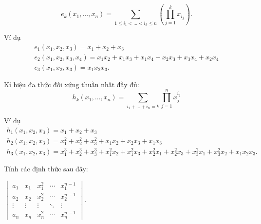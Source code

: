 \documentclass[class=linearalgebra,crop=false]{standalone}
\begin{document}
\[
    e_{k}(x_{1}, \ldots, x_{n}) = \sum_{1\le i_{1} < \ldots < i_{k} \le n}\left(\prod^{k}_{j=1}x_{i_{j}}\right).
\]

\par Ví dụ
\begin{gather*}
    e_{1}(x_{1}, x_{2}, x_{3}) = x_{1} + x_{2} + x_{3} \\
    e_{2}(x_{1}, x_{2}, x_{3}, x_{4}) = x_{1}x_{2} + x_{1}x_{3} + x_{1}x_{4} + x_{2}x_{3} + x_{3}x_{4} + x_{2}x_{4} \\
    e_{3}(x_{1}, x_{2}, x_{3}) = x_{1}x_{2}x_{3}.
\end{gather*}

\par Kí hiệu đa thức đối xứng thuần nhất đầy đủ:
\[
    h_{k}(x_{1}, \ldots, x_{n}) = \sum_{i_{1}+\ldots+i_{n}=k}\prod^{n}_{j=1}x^{i_{j}}_{j}
\]

\par Ví dụ
\begin{gather*}
    h_{1}(x_{1}, x_{2}, x_{3}) = x_{1} + x_{2} + x_{3} \\
    h_{2}(x_{1}, x_{2}, x_{3}) = x_{1}^{2} + x_{2}^{2} + x_{3}^{2} + x_{1}x_{2} + x_{2}x_{3} + x_{1}x_{3} \\
    h_{3}(x_{1}, x_{2}, x_{3}) = x_{1}^{3} + x_{2}^{3} + x_{3}^{3} + x_{1}^{2}x_{2} + x_{1}^{2}x_{3} + x_{2}^{2}x_{1} + x_{2}^{2}x_{3} + x_{3}^{2}x_{1} + x_{3}^{2}x_{2} + x_{1}x_{2}x_{3}.
\end{gather*}

\par Tính các định thức sau đây:

\begin{exercise}
    $\begin{vmatrix}
            a_{1}  & x_{1}  & x_{1}^{2} & \cdots & x_{1}^{n-1} \\
            a_{2}  & x_{2}  & x_{2}^{2} & \cdots & x_{2}^{n-1} \\
            \vdots & \vdots & \vdots    & \ddots & \vdots      \\
            a_{n}  & x_{n}  & x_{n}^{2} & \cdots & x_{n}^{n-1}
        \end{vmatrix}$.
\end{exercise}
\end{document}
